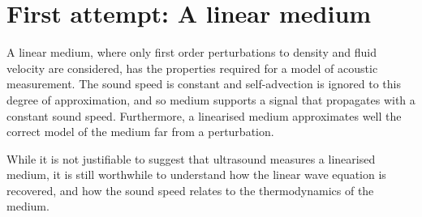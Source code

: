 







\section{First attempt: A linear medium}\label{sec:linearFluid}


A linear medium, where only first order perturbations to density and fluid velocity are considered,
has the properties required for a model of acoustic measurement.
The sound speed is constant and self-advection is ignored to this degree of approximation,
and so medium supports a signal that propagates with a constant sound speed.
Furthermore, a linearised medium approximates well the correct model of the medium far from a perturbation.

While it is not justifiable to suggest that ultrasound measures a linearised medium,
it is still worthwhile to understand how the linear wave equation is recovered,
and how the sound speed relates to the thermodynamics of the medium.

